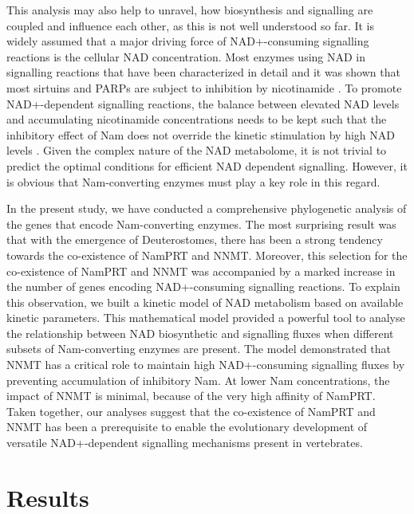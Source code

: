 \documentclass[paper=a4, 12pt]{scrartcl}
\begin{document}
This analysis may also help to unravel, how biosynthesis and signalling are coupled and influence each other, as this is not well understood so far. It is widely assumed that a major driving force of NAD+-consuming signalling reactions is the cellular NAD concentration. Most enzymes using NAD in signalling reactions that have been characterized in detail and it was shown that most sirtuins and PARPs are subject to inhibition by nicotinamide \cite{Borra2004; Ko2012}. To promote NAD+-dependent signalling reactions, the balance between elevated NAD levels and accumulating nicotinamide concentrations needs to be kept such that the inhibitory effect of Nam does not override the kinetic stimulation by high NAD levels . Given the complex nature of the NAD metabolome, it is not trivial to predict the optimal conditions for efficient NAD dependent signalling. However, it is obvious that Nam-converting enzymes must play a key role in this regard.

In the present study, we have conducted a comprehensive phylogenetic analysis of the genes that encode Nam-converting enzymes. The most surprising result was that with the emergence of Deuterostomes, there has been a strong tendency towards the co-existence of NamPRT and NNMT. Moreover, this selection for the co-existence of NamPRT and NNMT was accompanied by a marked increase in the number of genes encoding NAD+-consuming signalling reactions. To explain this observation, we built a kinetic model of NAD metabolism based on available kinetic parameters. This mathematical model provided a powerful tool to analyse the relationship between NAD biosynthetic and signalling fluxes when different subsets of Nam-converting enzymes are present. The model demonstrated that NNMT has a critical role to maintain high NAD+-consuming signalling fluxes by preventing accumulation of inhibitory Nam. At lower Nam concentrations, the impact of NNMT is minimal, because of the very high affinity of NamPRT. Taken together, our analyses suggest that the co-existence of NamPRT and NNMT has been a prerequisite to enable the evolutionary development of versatile NAD+-dependent signalling mechanisms present in vertebrates.


\section{Results}
\end{document}
